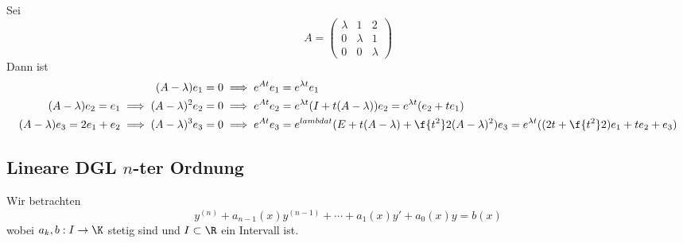 \documentclass[a4paper,10pt]{scrartcl}
\begin{document}
\begin{ex*}
	Sei
	\[
		A = \begin{pmatrix}\lambda & 1 & 2\\ 0& \lambda&1\\ 0& 0& \lambda\end{pmatrix}
	\]
	Dann ist
	\begin{align*}
		(A-\lambda)e_1 = 0 &\implies e^{At}e_1 = e^{\lambda t}e_1\\
		(A-\lambda)e_2 = e_1 \implies (A-\lambda)^2e_2 = 0 &\implies e^{At}e_2 = e^{\lambda t}(I+t(A-\lambda))e_2 = e^{\lambda t}(e_2 + t e_1)\\
		(A-\lambda)e_3 = 2e_1 + e_2 \implies (A-\lambda)^3e_3 = 0 &\implies e^{At}e_3 = e^{lambda t}(E + t(A-\lambda) + \f{t^2}2 (A-\lambda)^2) e_3 = e^{\lambda t}((2t + \f {t^2}2)e_1 + te_2 + e_3)
	\end{align*}
\end{ex*}


\subsection{Lineare DGL $n$-ter Ordnung}


Wir betrachten
\[
	y^{(n)} + a_{n-1}(x)y^{(n-1)} + \dotsb + a_1(x)y' + a_0(x)y = b(x)
\]
wobei $a_k, b : I\to \K$ stetig sind und $I\subset \R$ ein Intervall ist.
\end{document}
